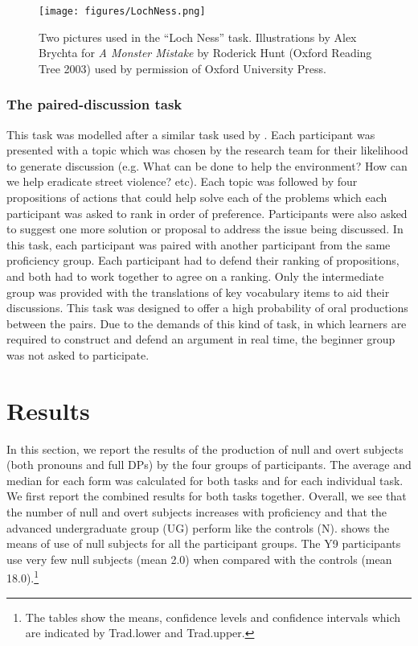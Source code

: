 \documentclass[output=paper]{langscibook}
\begin{document}
\begin{figure}
    \texttt{[image: figures/LochNess.png]}
    \caption{Two pictures used in the “Loch Ness” task. Illustrations by Alex Brychta for \textit{A Monster Mistake} by Roderick Hunt (Oxford Reading Tree 2003) used by permission of Oxford University Press.\label{fig:dominguez:story}}
\end{figure}



\subsubsection{The paired-discussion task}\largerpage

This task was modelled after a similar task used by \citet{Dippold2006}. Each participant was presented with a topic which was chosen by the research team for their likelihood to generate discussion (e.g. What can be done to help the environment? How can we help eradicate street violence? etc). Each topic was followed by four propositions of actions that could help solve each of the problems which each participant was asked to rank in order of preference. Participants were also asked to suggest one more solution or proposal to address the issue being discussed. In this task, each participant was paired with another participant from the same proficiency group. Each participant had to defend their ranking of propositions, and both had to work together to agree on a ranking. Only the intermediate group was provided with the translations of key vocabulary items to aid their discussions. This task was designed to offer a high probability of oral productions between the pairs. Due to the demands of this kind of task, in which learners are required to construct and defend an argument in real time, the beginner group was not asked to participate.

\section{Results}

In this section, we report the results of the production of null and overt subjects (both pronouns and full DPs) by the four groups of participants. The average and median for each form was calculated for both tasks and for each individual task. We first report the combined results for both tasks together. Overall, we see that the number of null and overt subjects increases with proficiency and that the advanced undergraduate group (UG) perform like the controls (N).  shows the means of use of null subjects for all the participant groups. The Y9 participants use very few null subjects (mean 2.0) when compared with the controls (mean 18.0).\footnote{The tables show the means, confidence levels and confidence intervals which are indicated by Trad.lower and Trad.upper.}
\end{document}
